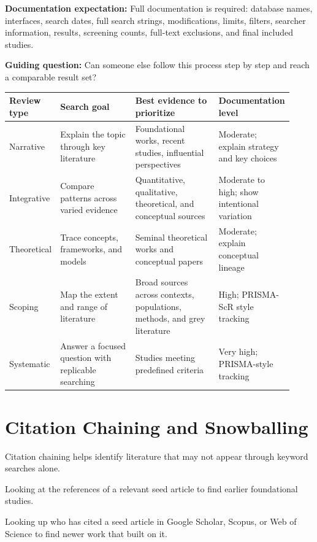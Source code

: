 \documentclass[11pt,letterpaper]{article}
\begin{document}
\textbf{Documentation expectation:} Full documentation is required: database names, interfaces, search dates, full search strings, modifications, limits, filters, searcher information, results, screening counts, full-text exclusions, and final included studies.

\textbf{Guiding question:} Can someone else follow this process step by step and reach a comparable result set?

\begin{longtable}{@{}p{0.15\linewidth}p{0.27\linewidth}p{0.30\linewidth}p{0.20\linewidth}@{}}
\toprule
\textbf{Review type} & \textbf{Search goal} & \textbf{Best evidence to prioritize} & \textbf{Documentation level}\\
\midrule
Narrative & Explain the topic through key literature & Foundational works, recent studies, influential perspectives & Moderate; explain strategy and key choices\\
Integrative & Compare patterns across varied evidence & Quantitative, qualitative, theoretical, and conceptual sources & Moderate to high; show intentional variation\\
Theoretical & Trace concepts, frameworks, and models & Seminal theoretical works and conceptual papers & Moderate; explain conceptual lineage\\
Scoping & Map the extent and range of literature & Broad sources across contexts, populations, methods, and grey literature & High; PRISMA-ScR style tracking\\
Systematic & Answer a focused question with replicable searching & Studies meeting predefined criteria & Very high; PRISMA-style tracking\\
\bottomrule
\end{longtable}

\section{Citation Chaining and Snowballing}

Citation chaining helps identify literature that may not appear through keyword searches alone.

\begin{description}[leftmargin=1.35in,style=nextline]
  \item[Backward snowballing] Looking at the references of a relevant seed article to find earlier foundational studies.
  \item[Forward snowballing] Looking up who has cited a seed article in Google Scholar, Scopus, or Web of Science to find newer work that built on it.
\end{description}
\end{document}
